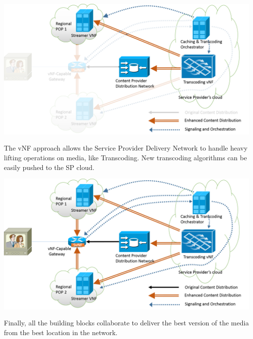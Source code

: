 \documentclass[a4paper]{beamer}
\begin{document}
\begin{frame}{}
	\centering
	\includegraphics[width=0.95\linewidth]{highleveldesign6.png}
	\vspace{1em}
	\begin{block}{}
		The vNF approach allows the Service Provider Delivery Network to handle heavy lifting operations on media, like Transcoding. New transcoding algorithms can be easily pushed to the SP cloud.
	\end{block}
\end{frame}


\begin{frame}{}
	\centering
	\includegraphics[width=0.95\linewidth]{highleveldesign7.png}
	\vspace{2em}
	\begin{block}{}
		Finally, all the building blocks collaborate to deliver the best version of the media from the best location in the network.
	\end{block}
\end{frame}
\end{document}
